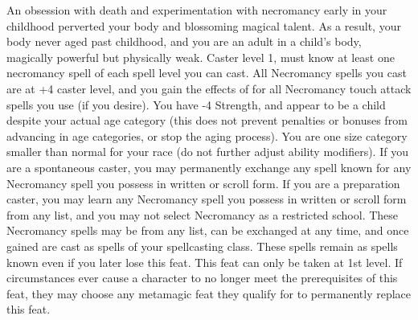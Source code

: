 \descfeat
{An obsession with death and experimentation with necromancy early in your childhood perverted your body and blossoming magical talent. As a result, your body never aged past childhood, and you are an adult in a child's body, magically powerful but physically weak.}
{Caster level 1, must know at least one necromancy spell of each spell level you can cast.}
{All Necromancy spells you cast are at +4 caster level, and you gain the effects of  for all Necromancy touch attack spells you use (if you desire). You have -4 Strength, and appear to be a child despite your actual age category (this does not prevent penalties or bonuses from advancing in age categories, or stop the aging process). You are one size category smaller than normal for your race (do not further adjust ability modifiers). If you are a spontaneous caster, you may permanently exchange any spell known for any Necromancy spell you possess in written or scroll form. If you are a preparation caster, you may learn any Necromancy spell you possess in written or scroll form from any list, and you may not select Necromancy as a restricted school. These Necromancy spells may be from any list, can be exchanged at any time, and once gained are cast as spells of your spellcasting class. These spells remain as spells known even if you later lose this feat.}
{This feat can only be taken at 1st level. If circumstances ever cause a character to no longer meet the prerequisites of this feat, they may choose any metamagic feat they qualify for to permanently replace this feat.}

